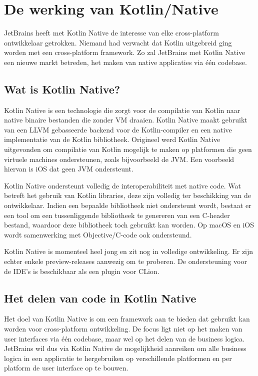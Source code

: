 
\chapter{De werking van Kotlin/Native}
JetBrains heeft met Kotlin Native de interesse van elke cross-platform ontwikkelaar getrokken. Niemand had verwacht dat Kotlin uitgebreid ging worden met een cross-platform framework. Zo zal JetBrains met Kotlin Native een nieuwe markt betreden, het maken van native applicaties via één codebase.
\label{ch:kotlinnative}

\section{Wat is Kotlin Native?}
Kotlin Native is een technologie die zorgt voor de compilatie van Kotlin naar native binaire bestanden die zonder VM draaien. Kotlin Native maakt gebruikt van een LLVM gebasseerde backend voor de Kotlin-compiler en een native implementatie van de Kotlin bibliotheek. Origineel werd Kotlin Native uitgevonden om compilatie van Kotlin mogelijk te maken op platformen die geen virtuele machines ondersteunen, zoals bijvoorbeeld de JVM. Een voorbeeld hiervan is iOS dat geen JVM ondersteunt.

Kotlin Native ondersteunt volledig de interoperabiliteit met native code. Wat betreft het gebruik van Kotlin libraries, deze zijn volledig ter beschikking van de ontwikkelaar. Indien een bepaalde bibliotheek niet ondersteunt wordt, bestaat er een tool om een tussenliggende bibliotheek te genereren van een C-header bestand, waardoor deze bibliotheek toch gebruikt kan worden.  Op macOS en iOS wordt samenwerking met Objective/C-code ook ondersteund.

Kotlin Native is momenteel heel jong en zit nog in volledige ontwikkeling. Er zijn echter enkele preview-releases aanwezig om te proberen. De ondersteuning voor de IDE's is beschikbaar als een plugin voor CLion.

\section{Het delen van code in Kotlin Native}
\label{sec:sharingcode}
Het doel van Kotlin Native is om een framework aan te bieden dat gebruikt kan worden voor cross-platform ontwikkeling. De focus ligt niet op het maken van user interfaces via één codebase, maar wel op het delen van de business logica. JetBrains wil dus via Kotlin Native de mogelijkheid aanreiken om alle business logica in een applicatie te hergebruiken op verschillende platformen en per platform de user interface op te bouwen.

